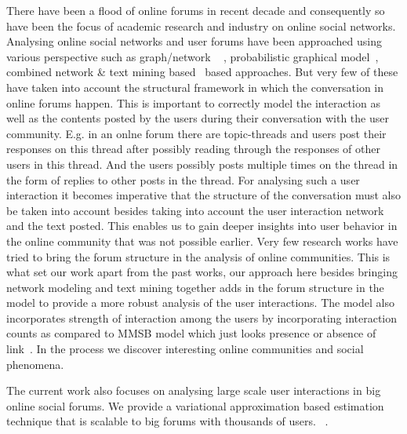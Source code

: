 There have been a flood of online forums in recent decade and consequently so
have been the focus of academic research and industry on online social networks. 
Analysing online social networks and user forums have been approached using
various perspective such as graph/network ~\cite{Shi:2000:NCI:351581.351611,
Shi00learningsegmentation} , probabilistic 
graphical model~\cite{ Airoldi:2008:MMS:1390681.1442798}, 
combined network \& text mining
based~\cite{Ho:2012:DHT:2187836.2187936,Nallapati:2008:JLT:1401890.1401957}
based approaches.
But very few of these have taken into account the structural framework in which
the conversation in online forums happen. This is important to correctly model the
interaction as well as the contents posted by the users during their
conversation with the user community. E.g. in an onlne forum there are topic-threads 
and users
post their responses on this thread after possibly reading through the responses
of other users in this thread. And the users possibly posts multiple times on
the thread in the form of replies to other posts in the thread. For analysing
such a user interaction it becomes imperative that the structure of the
conversation must also be taken into account  besides taking into account the 
user interaction
network and the text posted. This enables us to gain
deeper insights into user behavior in the online community that was not possible
earlier. Very few research works have tried to bring the forum structure in the
analysis of online communities. This is what set our work apart from the past works, our
approach here besides bringing network modeling and text mining together adds in
the forum structure in the model to provide a more robust analysis of
the user interactions. The model also incorporates strength of interaction
among the users by incorporating interaction counts as compared to MMSB model
which just looks presence or absence of link~\cite{Airoldi:2008:MMS:1390681.1442798}. 
In the process we discover interesting online communities and social phenomena.

The current work also focuses on analysing large scale user interactions in big
online social forums. We provide a variational approximation based estimation
technique that is scalable to big forums with thousands of users.
~. 


